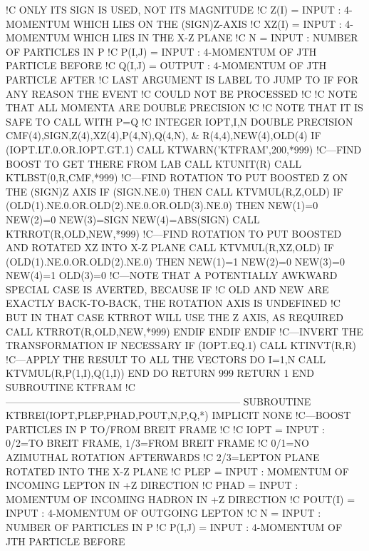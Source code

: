 !C                        ONLY ITS SIGN IS USED, NOT ITS MAGNITUDE
!C   Z(I)    = INPUT  : 4-MOMENTUM WHICH LIES ON THE (SIGN)Z-AXIS
!C   XZ(I)   = INPUT  : 4-MOMENTUM WHICH LIES IN THE X-Z PLANE
!C   N       = INPUT  : NUMBER OF PARTICLES IN P
!C   P(I,J)  = INPUT  : 4-MOMENTUM OF JTH PARTICLE BEFORE
!C   Q(I,J)  = OUTPUT : 4-MOMENTUM OF JTH PARTICLE AFTER
!C   LAST ARGUMENT IS LABEL TO JUMP TO IF FOR ANY REASON THE EVENT
!C   COULD NOT BE PROCESSED
!C
!C   NOTE THAT ALL MOMENTA ARE DOUBLE PRECISION
!C
!C   NOTE THAT IT IS SAFE TO CALL WITH P=Q
!C
      INTEGER IOPT,I,N
      DOUBLE PRECISION CMF(4),SIGN,Z(4),XZ(4),P(4,N),Q(4,N), &
           R(4,4),NEW(4),OLD(4)
      IF (IOPT.LT.0.OR.IOPT.GT.1) CALL KTWARN('KTFRAM',200,*999)
!C---FIND BOOST TO GET THERE FROM LAB
      CALL KTUNIT(R)
      CALL KTLBST(0,R,CMF,*999)
!C---FIND ROTATION TO PUT BOOSTED Z ON THE (SIGN)Z AXIS
      IF (SIGN.NE.0) THEN
         CALL KTVMUL(R,Z,OLD)
         IF (OLD(1).NE.0.OR.OLD(2).NE.0.OR.OLD(3).NE.0) THEN
            NEW(1)=0
            NEW(2)=0
            NEW(3)=SIGN
            NEW(4)=ABS(SIGN)
            CALL KTRROT(R,OLD,NEW,*999)
!C---FIND ROTATION TO PUT BOOSTED AND ROTATED XZ INTO X-Z PLANE
            CALL KTVMUL(R,XZ,OLD)
            IF (OLD(1).NE.0.OR.OLD(2).NE.0) THEN
               NEW(1)=1
               NEW(2)=0
               NEW(3)=0
               NEW(4)=1
               OLD(3)=0
!C---NOTE THAT A POTENTIALLY AWKWARD SPECIAL CASE IS AVERTED, BECAUSE IF
!C   OLD AND NEW ARE EXACTLY BACK-TO-BACK, THE ROTATION AXIS IS UNDEFINED
!C   BUT IN THAT CASE KTRROT WILL USE THE Z AXIS, AS REQUIRED
               CALL KTRROT(R,OLD,NEW,*999)
            ENDIF
         ENDIF
      ENDIF
!C---INVERT THE TRANSFORMATION IF NECESSARY
      IF (IOPT.EQ.1) CALL KTINVT(R,R)
!C---APPLY THE RESULT TO ALL THE VECTORS
      DO I=1,N
         CALL KTVMUL(R,P(1,I),Q(1,I))
      END DO
      RETURN
999   RETURN 1
    END SUBROUTINE KTFRAM
!C-----------------------------------------------------------------------
    SUBROUTINE KTBREI(IOPT,PLEP,PHAD,POUT,N,P,Q,*)
      IMPLICIT NONE
!C---BOOST PARTICLES IN P TO/FROM BREIT FRAME
!C
!C   IOPT    = INPUT  : 0/2=TO BREIT FRAME, 1/3=FROM BREIT FRAME
!C                      0/1=NO AZIMUTHAL ROTATION AFTERWARDS
!C                      2/3=LEPTON PLANE ROTATED INTO THE X-Z PLANE
!C   PLEP    = INPUT  : MOMENTUM OF INCOMING LEPTON IN +Z DIRECTION
!C   PHAD    = INPUT  : MOMENTUM OF INCOMING HADRON IN +Z DIRECTION
!C   POUT(I) = INPUT  : 4-MOMENTUM OF OUTGOING LEPTON
!C   N       = INPUT  : NUMBER OF PARTICLES IN P
!C   P(I,J)  = INPUT  : 4-MOMENTUM OF JTH PARTICLE BEFORE
